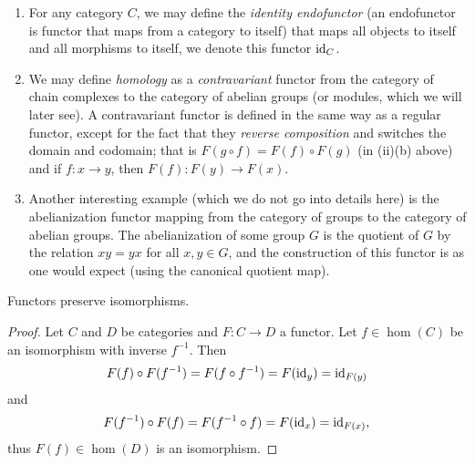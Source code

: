 \begin{example} \hspace{0em}
    \begin{enumerate}
        \item For any category $C$, we may define the \emph{identity endofunctor} (an endofunctor is functor that maps from a category to itself) that maps all objects to itself and all morphisms to itself, we denote this functor $\operatorname{id}_C$.
        \item We may define \emph{homology} as a \emph{contravariant} functor from the category of chain complexes to the category of abelian groups (or modules, which we will later see). A contravariant functor is defined in the same way as a regular functor, except for the fact that they \emph{reverse composition} and switches the domain and codomain; that is $F(g \circ f) = F(f) \circ F(g)$ (in (ii)(b) above) and if $f: x \to y$, then $F(f): F(y) \to F(x)$.
        \item Another interesting example (which we do not go into details here) is the abelianization functor mapping from the category of groups to the category of abelian groups. The abelianization of some group $G$ is the quotient of $G$ by the relation $xy = yx$ for all $x,y \in G$, and the construction of this functor is as one would expect (using the canonical quotient map).
    \end{enumerate}
\end{example}

\begin{proposition} \label{lem:functors-perserve-isomorphisms}
    Functors preserve isomorphisms.
\end{proposition}

\begin{proof}
    Let $C$ and $D$ be categories and $F: C \to D$ a functor. Let $f \in \hom(C)$ be an isomorphism with inverse $f^{-1}$. Then
    \[F(f) \circ F(f^{-1}) = F(f \circ f^{-1}) = F(\operatorname{id}_y) = \operatorname{id}_{F(y)}\]
    and
    \[F(f^{-1}) \circ F(f) = F(f^{-1} \circ f) = F(\operatorname{id}_x) = \operatorname{id}_{F(x)},\]
    thus $F(f) \in \hom(D)$ is an isomorphism.
\end{proof}

